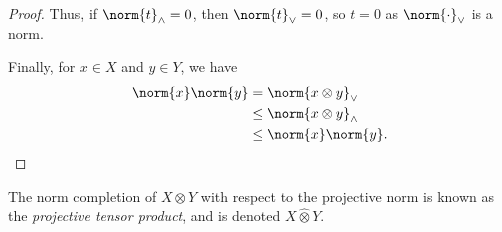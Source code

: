 \begin{proof}
  Thus, if $\norm{t}_{\wedge} = 0$, then $\norm{t}_{\vee} = 0$, so $t = 0$ as $\norm{\cdot}_{\vee}$ is a norm.\newline

  Finally, for $x\in X$ and $y\in Y$, we have
  \begin{align*}
    \norm{x}\norm{y} &= \norm{x\otimes y}_{\vee}\\
                     &\leq \norm{x\otimes y}_{\wedge}\\
                     &\leq \norm{x}\norm{y}.
  \end{align*}
\end{proof}
The norm completion of $X\otimes Y$ with respect to the projective norm is known as the \textit{projective tensor product}, and is denoted $X\hat\otimes Y$.\newline

